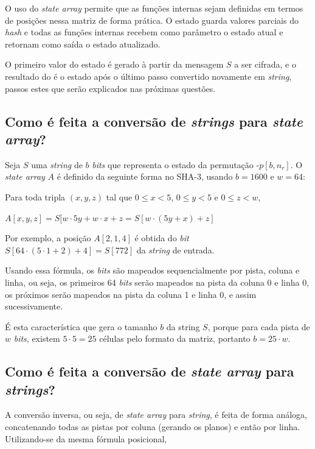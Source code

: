 O uso do \textit{state array} permite que as funções internas sejam definidas
em termos de posições nessa matriz de forma prática. O estado guarda valores
parciais do \textit{hash} e todas as funções internas recebem como parâmetro
o estado atual e retornam como saída o estado atualizado.

O primeiro valor do estado é gerado à partir da mensagem $S$ a ser cifrada, e o
resultado do  é o estado após o último passo convertido novamente em
\textit{string}, passos estes que serão explicados nas próximas questões.

\subsection{Como é feita a conversão de \textit{strings} para
    \textit{state array}?}

Seja $S$ uma \textit{string} de $b$ \textit{bits} que representa o estado da
permutação \Keccak-$p[b, n_{r}]$. O \textit{state array} $A$ é definido da
seguinte forma no SHA-3, usando $b = 1600$ e $w = 64$:

Para toda tripla $(x, y, z)$ tal que $0 \leq x < 5$, $0 \leq y < 5$ e
$0 \leq z < w$,

\begin{center}
    $A[x, y, z] = S[w \cdot 5y + w \cdot x + z = S[w \cdot (5y+x) + z]$
\end{center}

Por exemplo, a posição $A[2, 1, 4]$ é obtida do \textit{bit}
$S[64 \cdot (5 \cdot 1 + 2) + 4] = S[772]$ da \textit{string} de entrada.

Usando essa fórmula, os \textit{bits} são mapeados sequencialmente por pista,
coluna e linha, ou seja, os primeiros 64 \textit{bits} serão mapeados na pista
da coluna 0 e linha 0, os próximos serão mapeados na pista da coluna 1 e linha
0, e assim sucessivamente.

É esta característica que gera o tamanho $b$ da string $S$, porque para cada
pista de $w$ \textit{bits}, existem $5 \cdot 5 = 25$ células pelo formato da
matriz, portanto $b = 25 \cdot w$.

\subsection{Como é feita a conversão de \textit{state array} para
    \textit{strings}?}

A conversão inversa, ou seja, de \textit{state array} para \textit{string}, é
feita de forma análoga, concatenando todas as pistas por coluna (gerando os
planos) e então por linha. Utilizando-se da mesma fórmula posicional,

